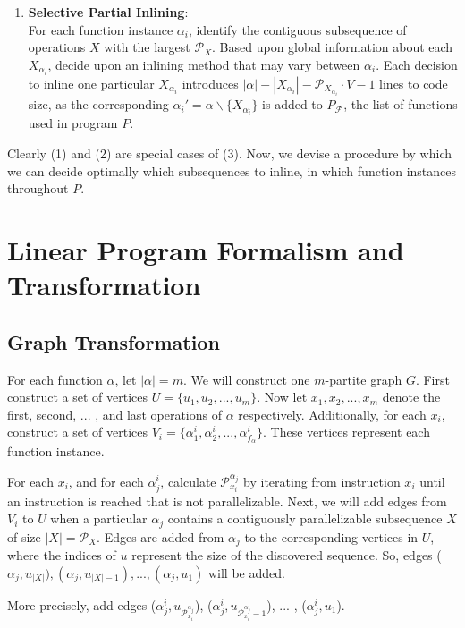 \documentclass[12pt,twoside]{article}
\begin{document}
\begin{enumerate}
	\item \textbf{Selective Partial Inlining}:\\
		For each function instance $\alpha_i$, identify the contiguous subsequence of operations $X$ with the largest $\mathcal{P}_X$. Based upon global information about each $X_{\alpha_i}$, decide upon an inlining method that may vary between $\alpha_i$. Each decision to inline one particular $X_{\alpha_i}$ introduces $|\alpha| - |X_{\alpha_i}| - \mathcal{P}_{X_{\alpha_i}} \cdot V - 1$ lines to code size, as the corresponding $\alpha_i' = \alpha\backslash \{X_{\alpha_i}\}$ is added to $P_{\mathcal{F}}$, the list of functions used in program $P$. 
\end{enumerate}

Clearly (1) and (2) are special cases of (3). Now, we devise a procedure by which we can decide optimally which subsequences to inline, in which function instances throughout $P$.  

\section{Linear Program Formalism and Transformation}
\subsection{Graph Transformation}
For each function $\alpha$, let $|\alpha| = m$. We will construct one $m$-partite graph $G$. First construct a set of vertices $U = \{u_1, u_2, ... , u_{m}\}$. Now let $x_1, x_2, ... , x_{m}$ denote the first, second, ... , and last operations of $\alpha$ respectively. Additionally, for each $x_i$, construct a set of vertices $V_i = \{\alpha_1^i, \alpha_2^i, ... , \alpha_{f_{\alpha}}^i\}$. These vertices represent each function instance. 

For each $x_i$, and for each $\alpha_j^i$, calculate $\mathcal{P}_{x_i}^{\alpha_j}$ by iterating from instruction $x_i$ until an instruction is reached that is not parallelizable. Next, we will add edges from $V_i$ to $U$ when a particular $\alpha_j$ contains a contiguously parallelizable subsequence $X$ of size $|X| = \mathcal{P}_X$. Edges are added from $\alpha_j$ to the corresponding vertices in $U$, where the indices of $u$ represent the size of the discovered sequence. So, edges ($\alpha_j, u_{|X|}), (\alpha_j, u_{|X| - 1}), ... , (\alpha_j, u_1)$ will be added.  

More precisely, add edges ($\alpha_j^i,u_{\mathcal{P}_{x_i}^{\alpha_j}}$), ($\alpha_j^i,u_{\mathcal{P}_{x_i}^{\alpha_j}-1}$), ... , ($\alpha_j^i,u_1$).
\end{document}
